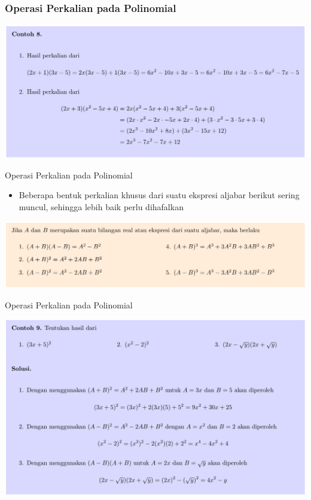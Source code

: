\documentclass[pdflatex,compress,mathserif]{beamer}
\begin{document}
\begin{frame}
	\frametitle{Operasi Perkalian pada Polinomial}
	\begin{center}
		\includegraphics[width=\linewidth]{img/img22}
	\end{center}
\end{frame}

\begin{frame}{Operasi Perkalian pada Polinomial}
	\begin{itemize}
		\item Beberapa bentuk perkalian khusus dari suatu ekspresi aljabar berikut sering muncul, sehingga lebih baik perlu dihafalkan
	\end{itemize}
	\begin{center}
		\includegraphics[width=\linewidth]{img/img23}
	\end{center}
\end{frame}

\begin{frame}{Operasi Perkalian pada Polinomial}
	\begin{center}
		\includegraphics[width=\linewidth]{img/img24}
	\end{center}
\end{frame}
\end{document}
